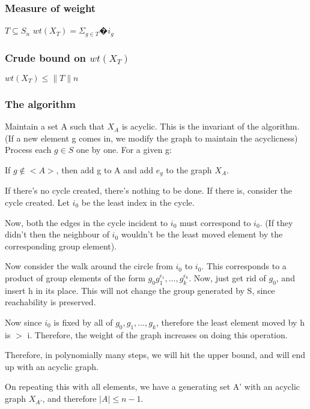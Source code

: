 \subsubsection{Measure of weight}
$T \subseteq S_n$
$wt(X_T )=\Sigma _{g \in T}�i_g$

\subsubsection{Crude bound on $wt(X_T )$}
$wt(X_T )\leq \|T\|n$

\subsubsection{The algorithm}
Maintain a set A such that $X_A$  is acyclic. This is the invariant of the algorithm. (If a new element g comes in, we modify the graph to maintain the acyclicness)\newline
Process each $g \in S$ one by one.\newline\newline
For a given g:

	If $g \notin  <A>$, then add g to A and add $e_g$  to the graph $X_A$.

	If there's no cycle created, there's nothing to be done. If there is, consider the cycle created. Let $i_0$  be the least index in the cycle.

	Now, both the edges in the cycle incident to $i_0$ must correspond to $i_0$. (If they didn't then the neighbour of $i_0$ wouldn't be the least moved element by the corresponding group element).
	
	Now consider the walk around the circle from $i_0$ to $i_0$. This corresponds to a product of group elements of the form $g_0 g_1^{\epsilon_1}, \ldots, g_k^{\epsilon_k}$. Now, just get rid of $g_0$, and insert h in its place. This will not change the group generated by S, since reachability is preserved.
	
	Now since $i_0$ is fixed by all of $g_0, g_1,\ldots, g_k$, therefore the least element moved by h is $>$ i. Therefore, the weight of the graph increases on doing this operation.
	
	Therefore, in polynomially many steps, we will hit the upper bound, and will end up with an acyclic graph.
	
	On repeating this with all elements, we have a generating set A' with an acyclic graph $X_{A'}$, and therefore $|A|\leq n-1$.


